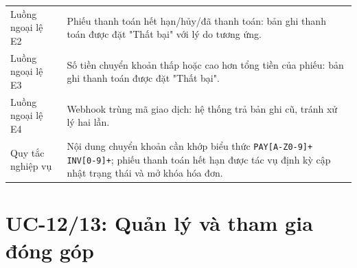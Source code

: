 ﻿\documentclass[12pt,a4paper]{report}
\begin{document}
\begin{longtable}{L{4cm} L{10.5cm}}
Luồng ngoại lệ E2 & Phiếu thanh toán hết hạn/hủy/đã thanh toán: bản ghi thanh toán được đặt "Thất bại" với lý do tương ứng. \\
Luồng ngoại lệ E3 & Số tiền chuyển khoản thấp hoặc cao hơn tổng tiền của phiếu: bản ghi thanh toán được đặt "Thất bại". \\
Luồng ngoại lệ E4 & Webhook trùng mã giao dịch: hệ thống trả bản ghi cũ, tránh xử lý hai lần. \\
Quy tắc nghiệp vụ & Nội dung chuyển khoản cần khớp biểu thức \texttt{PAY[A-Z0-9]+ INV[0-9]+}; phiếu thanh toán hết hạn được tác vụ định kỳ cập nhật trạng thái và mở khóa hóa đơn. \\
\bottomrule
\end{longtable}

\section{UC-12/13: Quản lý và tham gia đóng góp}
\end{document}
